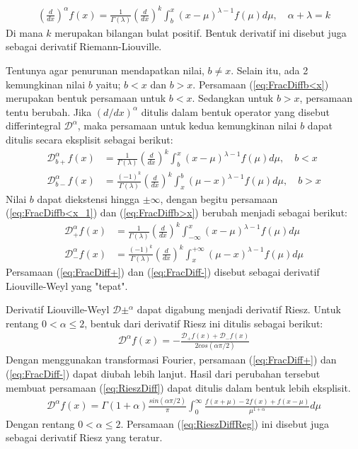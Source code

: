 \begin{align}
    \left(\frac{d}{dx}\right)^\alpha f(x) = \frac{1}{\Gamma(\lambda)} \left(\frac{d}{dx}\right)^k \int_b^x (x-\mu)^{\lambda-1}f(\mu)d\mu, \quad \alpha + \lambda = k \label{eq:FracDiffb<x}
\end{align}
Di mana \(k\) merupakan bilangan bulat positif. Bentuk derivatif ini disebut juga sebagai derivatif Riemann-Liouville. 
\par Tentunya agar penurunan mendapatkan nilai, \(b \neq x\). Selain itu, ada 2 kemungkinan nilai \(b\) yaitu; \(b<x\) dan \(b>x\). Persamaan (\ref{eq:FracDiffb<x}) merupakan bentuk persamaan untuk \(b<x\). Sedangkan untuk \(b>x\), persamaan tentu berubah. Jika \((d/dx)^\alpha\) ditulis dalam bentuk operator yang disebut differintegral \(\mathcal{D}^\alpha\), maka persamaan untuk kedua kemungkinan nilai \(b\) dapat ditulis secara eksplisit sebagai berikut:
\begin{align}
    \mathcal{D}_{b+}^\alpha f(x) &= \frac{1}{\Gamma(\lambda)} \left(\frac{d}{dx}\right)^k \int_b^x (x-\mu)^{\lambda-1}f(\mu)d\mu, \quad b<x \label{eq:FracDiffb<x_1} \\
    \mathcal{D}_{b-}^\alpha f(x) &= \frac{(-1)^k}{\Gamma(\lambda)} \left(\frac{d}{dx}\right)^k \int_x^b (\mu -x)^{\lambda-1}f(\mu)d\mu, \quad b>x \label{eq:FracDiffb>x}
\end{align}
Nilai \(b\) dapat diekstensi hingga \(\pm \infty\), dengan begitu persamaan (\ref{eq:FracDiffb<x_1}) dan (\ref{eq:FracDiffb>x}) berubah menjadi sebagai berikut:
\begin{align}
    \mathcal{D}_{+}^\alpha f(x) &= \frac{1}{\Gamma(\lambda)} \left(\frac{d}{dx}\right)^k \int_{-\infty}^x (x-\mu)^{\lambda-1}f(\mu)d\mu \label{eq:FracDiff+} \\
    \mathcal{D}_{-}^\alpha f(x) &= \frac{(-1)^k}{\Gamma(\lambda)} \left(\frac{d}{dx}\right)^k \int_x^{+\infty} (\mu -x)^{\lambda-1}f(\mu)d\mu \label{eq:FracDiff-}
\end{align}
Persamaan (\ref{eq:FracDiff+}) dan (\ref{eq:FracDiff-}) disebut sebagai derivatif Liouville-Weyl yang "tepat". 
\par Derivatif Liouville-Weyl \(\mathcal{D}\pm^\alpha\) dapat digabung menjadi derivatif Riesz. Untuk rentang \(0<\alpha\leq 2\), bentuk dari derivatif Riesz ini ditulis sebagai berikut:
\begin{align}
    \mathcal{D}^\alpha f(x) = -\frac{\mathcal{D}_{+}f(x)+\mathcal{D}_{-}f(x)}{2cos(\alpha\pi/2)} \label{eq:RieszDiff}
\end{align}
Dengan menggunakan transformasi Fourier, persamaan (\ref{eq:FracDiff+}) dan (\ref{eq:FracDiff-}) dapat diubah lebih lanjut. Hasil dari perubahan tersebut membuat persamaan (\ref{eq:RieszDiff}) dapat ditulis dalam bentuk lebih eksplisit.
\begin{align}
    \mathcal{D}^\alpha f(x) = \Gamma(1+\alpha) \frac{sin(\alpha\pi/2)}{\pi} \int_0^\infty \frac{f(x+\mu) - 2f(x) + f(x-\mu)}{\mu^{1+\alpha}} d\mu \label{eq:RieszDiffReg}
\end{align}
Dengan rentang \(0<\alpha\leq 2\). Persamaan (\ref{eq:RieszDiffReg}) ini disebut juga sebagai derivatif Riesz yang teratur. \cite{Mainardi2013Fractional}


